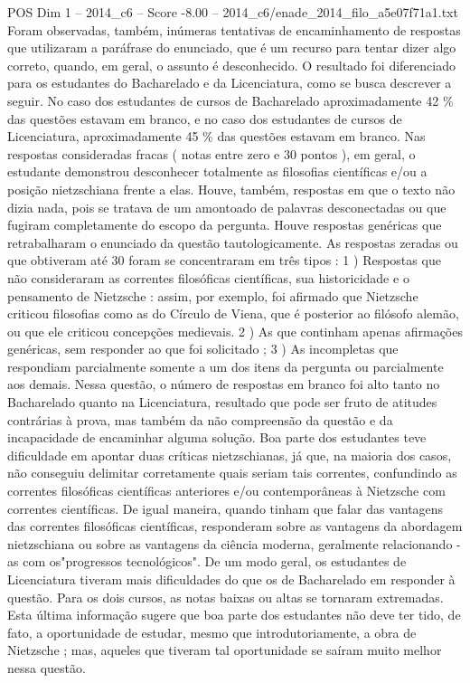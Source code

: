 \begin{textsample}{POS Dim 1 – 2014\_c6 – Score -8.00 – 2014\_c6/enade\_2014\_filo\_a5e07f71a1.txt}
Foram observadas, também, inúmeras tentativas de encaminhamento de respostas que utilizaram a paráfrase do enunciado, que é um recurso para tentar dizer algo correto, quando, em geral, o assunto é desconhecido.
O resultado foi diferenciado para os estudantes do Bacharelado e da Licenciatura, como se busca descrever a seguir.
No caso dos estudantes de cursos de Bacharelado aproximadamente 42 \% das questões estavam em branco, e no caso dos estudantes de cursos de Licenciatura, aproximadamente 45 \% das questões estavam em branco.
Nas respostas consideradas fracas ( notas entre zero e 30 pontos ), em geral, o estudante demonstrou desconhecer totalmente as filosofias científicas e/ou a posição nietzschiana frente a elas.
Houve, também, respostas em que o texto não dizia nada, pois se tratava de um amontoado de palavras desconectadas ou que fugiram completamente do escopo da pergunta.
Houve respostas genéricas que retrabalharam o enunciado da questão tautologicamente.
As respostas zeradas ou que obtiveram até 30 foram se concentraram em três tipos : 1 ) Respostas que não consideraram as correntes filosóficas científicas, sua historicidade e o pensamento de Nietzsche : assim, por exemplo, foi afirmado que Nietzsche criticou filosofias como as do Círculo de Viena, que é posterior ao filósofo alemão, ou que ele criticou concepções medievais. 2 ) As que continham apenas afirmações genéricas, sem responder ao que foi solicitado ; 3 ) As incompletas que respondiam parcialmente somente a um dos itens da pergunta ou parcialmente aos demais.
Nessa questão, o número de respostas em branco foi alto tanto no Bacharelado quanto na Licenciatura, resultado que pode ser fruto de atitudes contrárias à prova, mas também da não compreensão da questão e da incapacidade de encaminhar alguma solução.
Boa parte dos estudantes teve dificuldade em apontar duas críticas nietzschianas, já que, na maioria dos casos, não conseguiu delimitar corretamente quais seriam tais correntes, confundindo as correntes filosóficas científicas anteriores e/ou contemporâneas à Nietzsche com correntes científicas.
De igual maneira, quando tinham que falar das vantagens das correntes filosóficas científicas, responderam sobre as vantagens da abordagem nietzschiana ou sobre as vantagens da ciência moderna, geralmente relacionando -as com os"progressos tecnológicos".
De um modo geral, os estudantes de Licenciatura tiveram mais dificuldades do que os de Bacharelado em responder à questão.
Para os dois cursos, as notas baixas ou altas se tornaram extremadas.
Esta última informação sugere que boa parte dos estudantes não deve ter tido, de fato, a oportunidade de estudar, mesmo que introdutoriamente, a obra de Nietzsche ; mas, aqueles que tiveram tal oportunidade se saíram muito melhor nessa questão.

\end{textsample}

